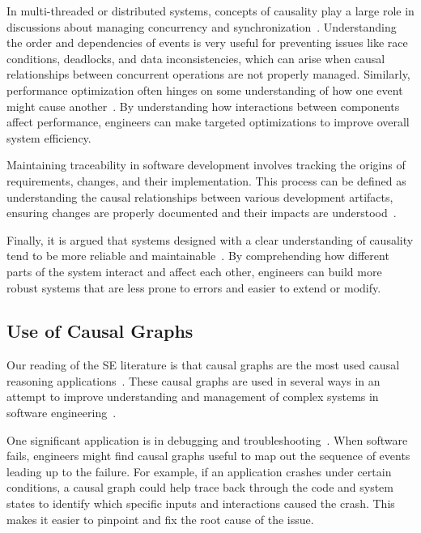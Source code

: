 \documentclass[]{svjour3}
\begin{document}
In multi-threaded or distributed systems, 
concepts of causality play a large role in 
discussions about managing concurrency and synchronization~\cite{485846, 6848128}. 
Understanding the order and dependencies of events is very useful for preventing issues like race conditions, deadlocks, and data inconsistencies, which can arise when causal relationships between concurrent operations are not properly managed. Similarly, performance optimization often hinges on 
some understanding of how one event might cause another~\cite{10.1007/978-3-030-59152-6_19, 10.1145/3492321.3519575, wu2019employing}. 
By understanding how interactions between components affect performance, engineers can make targeted optimizations to improve overall system efficiency.

Maintaining traceability in software development involves tracking the origins of requirements, changes, and their implementation. 
This process can be defined as understanding the causal relationships between various development artifacts, ensuring changes are properly documented and their impacts are understood~\cite{6644251}.

Finally, it is argued that systems designed with a clear understanding of causality tend to be more reliable and maintainable~\cite{7321183}. 
By comprehending how different parts of the system interact and affect each other, engineers can build more robust systems that are less prone to errors and easier to extend or modify. 

\subsection{Use of Causal Graphs}

Our reading of the SE literature is that causal graphs are the most used causal reasoning applications~\cite{10197835}. 
These causal graphs are used in several ways in an attempt to improve understanding and management of complex systems in software engineering~\cite{10197835}. 
 

One significant application is in debugging and troubleshooting~\cite{10.1145/3635709, 10.1145/3377811.3380377}.
When software fails, engineers might find causal graphs useful to map out the sequence of events leading up to the failure. 
For example, if an application crashes under certain conditions, a causal graph could help trace back through the code and system states to identify which specific inputs and interactions caused the crash. 
This makes it easier to pinpoint and fix the root cause of the issue. 
 
\end{document}
